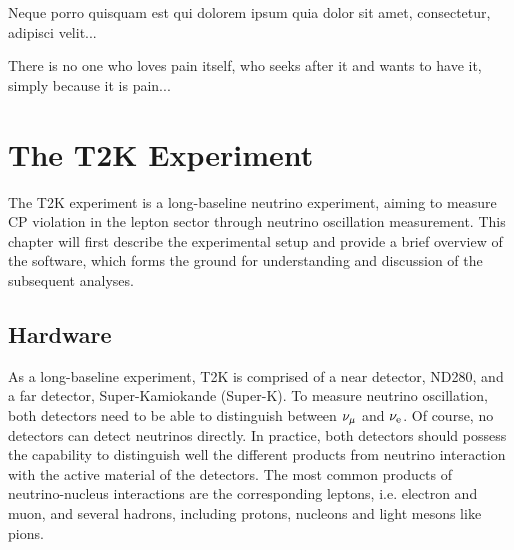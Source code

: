 \begin{savequote}[8cm]
\textlatin{Neque porro quisquam est qui dolorem ipsum quia dolor sit amet, consectetur, adipisci velit...}

There is no one who loves pain itself, who seeks after it and wants to have it, simply because it is pain...
\end{savequote}

\chapter{\label{ch:t2k}The T2K Experiment} 

\minitoc
The T2K experiment is a long-baseline neutrino experiment, aiming to measure CP violation in the lepton sector through neutrino oscillation measurement.
This chapter will first describe the experimental setup and provide a brief overview of the software, which forms the ground for understanding and discussion of the subsequent analyses.


\section{Hardware}
  As a long-baseline experiment, T2K is comprised of a near detector, ND280, and a far detector, Super-Kamiokande (Super-K).
  To measure neutrino oscillation, both detectors need to be able to distinguish between $\nu_{\mu}$ and $\nu_{\textrm{e}}$.  
  Of course, no detectors can detect neutrinos directly.
  In practice, both detectors should possess the capability to distinguish well the different products from neutrino interaction with the active material of the detectors.
  The most common products of neutrino-nucleus interactions are the corresponding leptons, i.e. electron and muon, and several hadrons, including protons, nucleons and light mesons like pions.

